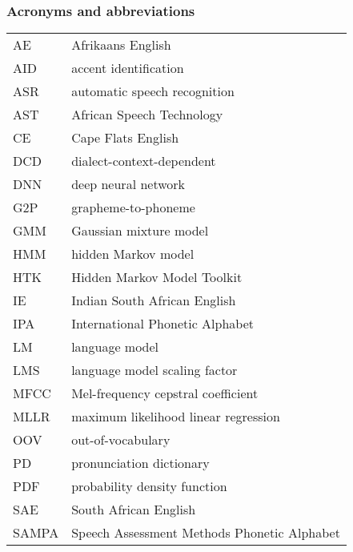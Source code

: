 \newpage
\subsubsection*{Acronyms and abbreviations}

\begingroup
\renewcommand{\arraystretch}{1.2}
\begin{tabular}{@{}p{2.5cm} l}
    AE      & Afrikaans English \\
    AID     & accent identification \\
    ASR     & automatic speech recognition \\
    AST     & African Speech Technology \\
    CE      & Cape Flats English \\
    DCD     & dialect-context-dependent \\
    DNN		& deep neural network \\
    G2P     & grapheme-to-phoneme \\
    GMM     & Gaussian mixture model \\
    HMM     & hidden Markov model \\
    HTK     & Hidden Markov Model Toolkit \\
    IE      & Indian South African English \\
    IPA     & International Phonetic Alphabet \\
    LM      & language model \\
    LMS     & language model scaling factor \\
    MFCC    & Mel-frequency cepstral coefficient \\
    MLLR    & maximum likelihood linear regression \\
    OOV     & out-of-vocabulary \\
    PD      & pronunciation dictionary \\
    PDF     & probability density function \\
    SAE     & South African English \\
    SAMPA   & Speech Assessment Methods Phonetic Alphabet \\
\end{tabular}
\endgroup

